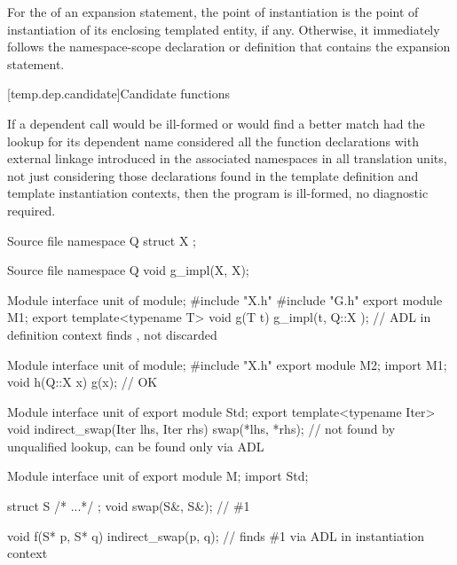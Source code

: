 \pnum
For the 
of an expansion statement,
the point of instantiation is the point of instantiation
of its enclosing templated entity, if any.
Otherwise, it immediately follows the namespace-scope declaration
or definition that contains the expansion statement.

[temp.dep.candidate]{Candidate functions}

\pnum
{}%
If a dependent call would be ill-formed or
would find a better match had the lookup for its dependent name
considered all the function declarations with external linkage
introduced in the associated namespaces in all translation units,
not just considering those declarations found in the template definition and
template instantiation contexts,
then the program is ill-formed, no diagnostic required.

\pnum
\begin{example}
\begin{codeblocktu}{Source file }
namespace Q {
  struct X { };
}
\end{codeblocktu}

\begin{codeblocktu}{Source file }
namespace Q {
  void g_impl(X, X);
}
\end{codeblocktu}

\begin{codeblocktu}{Module interface unit of }
module;
#include "X.h"
#include "G.h"
export module M1;
export template<typename T>
void g(T t) {
  g_impl(t, Q::X{ });   // ADL in definition context finds ,  not discarded
}
\end{codeblocktu}

\begin{codeblocktu}{Module interface unit of }
module;
#include "X.h"
export module M2;
import M1;
void h(Q::X x) {
   g(x);                // OK
}
\end{codeblocktu}
\end{example}

\pnum
\begin{example}
\begin{codeblocktu}{Module interface unit of }
export module Std;
export template<typename Iter>
void indirect_swap(Iter lhs, Iter rhs)
{
  swap(*lhs, *rhs);     //  not found by unqualified lookup, can be found only via ADL
}
\end{codeblocktu}

\begin{codeblocktu}{Module interface unit of }
export module M;
import Std;

struct S { /* ...*/ };
void swap(S&, S&);      // \#1

void f(S* p, S* q)
{
  indirect_swap(p, q);  // finds \#1 via ADL in instantiation context
}
\end{codeblocktu}
\end{example}


